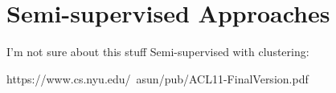 \section{Semi-supervised Approaches}

I'm not sure about this stuff
Semi-supervised with clustering:

https://www.cs.nyu.edu/~asun/pub/ACL11-FinalVersion.pdf


